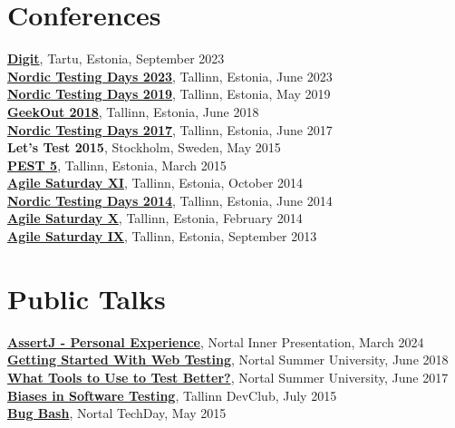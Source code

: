 \documentclass[a4paper, 12pt]{article}
\begin{document}
\section{Conferences}

\textbf{\href{https://digit.dev/}{Digit}}, Tartu, Estonia, September 2023\\
\textbf{\href{https://nordictestingdays.eu/}{Nordic Testing Days 2023}}, Tallinn, Estonia, June 2023\\
\textbf{\href{https://nordictestingdays.eu/2019-2/}{Nordic Testing Days 2019}}, Tallinn, Estonia, May 2019\\
\textbf{\href{https://2018.geekout.ee/}{GeekOut 2018}}, Tallinn, Estonia, June 2018\\
\textbf{\href{https://nordictestingdays.eu/2017-2/}{Nordic Testing Days 2017}}, Tallinn, Estonia, June 2017\\
\textbf{Let's Test 2015}, Stockholm, Sweden, May 2015\\
\textbf{\href{https://kristjanuba.wordpress.com/2014/09/27/pest5-testing-craft-social-or-technical/}{PEST 5}}, Tallinn, Estonia, March 2015\\
\textbf{\href{http://agile.ee/2014/agile-saturday-xi/}{Agile Saturday XI}}, Tallinn, Estonia, October 2014\\
\textbf{\href{https://nordictestingdays.eu/2014-2/}{Nordic Testing Days 2014}}, Tallinn, Estonia, June 2014\\
\textbf{\href{http://agile.ee/2014/agile-saturday-x/}{Agile Saturday X}}, Tallinn, Estonia, February 2014\\
\textbf{\href{http://agile.ee/agile-saturday/agile-saturday-ix/}{Agile Saturday IX}}, Tallinn, Estonia, September 2013

\section{Public Talks}

\textbf{\href{https://github.com/iriiiina/assertj-demo}{AssertJ - Personal Experience}}, Nortal Inner Presentation, March 2024\\
\textbf{\href{https://ivanova-irina.blogspot.com/2018/07/nortal-summer-university-workshop.html}{Getting Started With Web Testing}}, Nortal Summer University, June 2018\\
\textbf{\href{https://ivanova-irina.blogspot.com/2017/06/nortal-summer-university-workshop-about.html}{What Tools to Use to Test Better?}}, Nortal Summer University, June 2017\\
\textbf{\href{https://ivanova-irina.blogspot.com/2015/07/presentation-in-devclub-about-biases-in.html}{Biases in Software Testing}}, Tallinn DevClub, July 2015\\
\textbf{\href{https://ivanova-irina.blogspot.com/2015/06/my-first-ever-workshop-at-nortal.html}{Bug Bash}}, Nortal TechDay, May 2015
\end{document}

